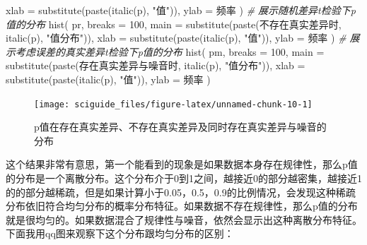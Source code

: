 \documentclass[]{tufte-book}
\newenvironment{Shaded}{}{}
\newcommand{\AttributeTok}[1]{\textcolor[rgb]{0.49,0.56,0.16}{#1}}
\newcommand{\CommentTok}[1]{\textcolor[rgb]{0.38,0.63,0.69}{\textit{#1}}}
\newcommand{\DecValTok}[1]{\textcolor[rgb]{0.25,0.63,0.44}{#1}}
\newcommand{\FunctionTok}[1]{\textcolor[rgb]{0.02,0.16,0.49}{#1}}
\newcommand{\NormalTok}[1]{#1}
\newcommand{\StringTok}[1]{\textcolor[rgb]{0.25,0.44,0.63}{#1}}
\begin{document}
\begin{Shaded}
\begin{Highlighting}[]
        \AttributeTok{xlab =} \FunctionTok{substitute}\NormalTok{(}\FunctionTok{paste}\NormalTok{(}\FunctionTok{italic}\NormalTok{(}\StringTok{\textquotesingle{}p\textquotesingle{}}\NormalTok{), }\StringTok{"值"}\NormalTok{)),}
        \AttributeTok{ylab =} \StringTok{\textquotesingle{}频率\textquotesingle{}}
\NormalTok{)}
\CommentTok{\# 展示随机差异t检验下p值的分布}
\FunctionTok{hist}\NormalTok{(}
\NormalTok{        pr,}
        \AttributeTok{breaks =} \DecValTok{100}\NormalTok{,}
        \AttributeTok{main =} \FunctionTok{substitute}\NormalTok{(}\FunctionTok{paste}\NormalTok{(}\StringTok{\textquotesingle{}不存在真实差异时\textquotesingle{}}\NormalTok{, }\FunctionTok{italic}\NormalTok{(}\StringTok{\textquotesingle{}p\textquotesingle{}}\NormalTok{), }\StringTok{"值分布"}\NormalTok{)),}
        \AttributeTok{xlab =} \FunctionTok{substitute}\NormalTok{(}\FunctionTok{paste}\NormalTok{(}\FunctionTok{italic}\NormalTok{(}\StringTok{\textquotesingle{}p\textquotesingle{}}\NormalTok{), }\StringTok{"值"}\NormalTok{)),}
        \AttributeTok{ylab =} \StringTok{\textquotesingle{}频率\textquotesingle{}}
\NormalTok{)}
\CommentTok{\# 展示考虑误差的真实差异t检验下p值的分布}
\FunctionTok{hist}\NormalTok{(}
\NormalTok{        pm,}
        \AttributeTok{breaks =} \DecValTok{100}\NormalTok{,}
        \AttributeTok{main =} \FunctionTok{substitute}\NormalTok{(}\FunctionTok{paste}\NormalTok{(}\StringTok{\textquotesingle{}存在真实差异与噪音时\textquotesingle{}}\NormalTok{, }\FunctionTok{italic}\NormalTok{(}\StringTok{\textquotesingle{}p\textquotesingle{}}\NormalTok{), }\StringTok{"值分布"}\NormalTok{)),}
        \AttributeTok{xlab =} \FunctionTok{substitute}\NormalTok{(}\FunctionTok{paste}\NormalTok{(}\FunctionTok{italic}\NormalTok{(}\StringTok{\textquotesingle{}p\textquotesingle{}}\NormalTok{), }\StringTok{"值"}\NormalTok{)),}
        \AttributeTok{ylab =} \StringTok{\textquotesingle{}频率\textquotesingle{}}
\NormalTok{)}
\end{Highlighting}
\end{Shaded}

\begin{figure}
\texttt{[image: sciguide\_files/figure-latex/unnamed-chunk-10-1]} \caption[p值在存在真实差异、不存在真实差异及同时存在真实差异与噪音的分布]{p值在存在真实差异、不存在真实差异及同时存在真实差异与噪音的分布}\label{fig:unnamed-chunk-10}
\end{figure}

这个结果非常有意思，第一个能看到的现象是如果数据本身存在规律性，那么p值的分布是一个离散分布。这个分布介于0到1之间，越接近0的部分越密集，越接近1的的部分越稀疏，但是如果计算小于0.05，0.5，0.9的比例情况，会发现这种稀疏分布依旧符合均匀分布的概率分布特征。如果数据不存在规律性，那么p值的分布就是很均匀的。如果数据混合了规律性与噪音，依然会显示出这种离散分布特征。下面我用qq图来观察下这个分布跟均匀分布的区别：
\end{document}
